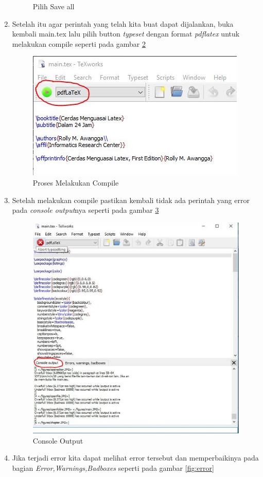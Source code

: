 \begin{enumerate}
\begin{figure}[!htbp]
  \caption{Pilih Save all}\label{fig:saveall}
\end{figure}
\item Setelah itu agar perintah yang telah kita buat dapat dijalankan, buka kembali main.tex lalu pilih button \textit{typeset} dengan format \textit{pdflatex} untuk melakukan compile  seperti pada gambar \ref{fig:compile}
 \begin{figure}[!htbp]
  \centering
  \includegraphics[width=.75\textwidth]{figures/compile.JPG}
  \caption{Proses Melakukan Compile}\label{fig:compile}
\end{figure}
\item Setelah melakukan compile pastikan kembali tidak ada perintah yang error pada \textit{console output}nya seperti pada gambar \ref{fig:cnpt}
\begin{figure}[!htbp]
  \centering
  \includegraphics[width=.75\textwidth]{figures/cnpt.JPG}
  \caption{Console Output}\label{fig:cnpt}
\end{figure}
\item Jika terjadi error kita dapat melihat error tersebut dan memperbaikinya pada bagian \textit{Error,Warnings,Badboxes} seperti pada gambar \ref{fig:error}

\end{enumerate}

